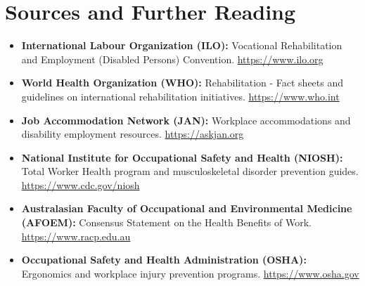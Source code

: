 \section*{Sources and Further Reading}
\begin{itemize}
    \item \textbf{International Labour Organization (ILO):} Vocational Rehabilitation and Employment (Disabled Persons) Convention. \url{https://www.ilo.org}
    \item \textbf{World Health Organization (WHO):} Rehabilitation - Fact sheets and guidelines on international rehabilitation initiatives. \url{https://www.who.int}
    \item \textbf{Job Accommodation Network (JAN):} Workplace accommodations and disability employment resources. \url{https://askjan.org}
    \item \textbf{National Institute for Occupational Safety and Health (NIOSH):} Total Worker Health program and musculoskeletal disorder prevention guides. \url{https://www.cdc.gov/niosh}
    \item \textbf{Australasian Faculty of Occupational and Environmental Medicine (AFOEM):} Consensus Statement on the Health Benefits of Work. \url{https://www.racp.edu.au}
    \item \textbf{Occupational Safety and Health Administration (OSHA):} Ergonomics and workplace injury prevention programs. \url{https://www.osha.gov}
\end{itemize}
